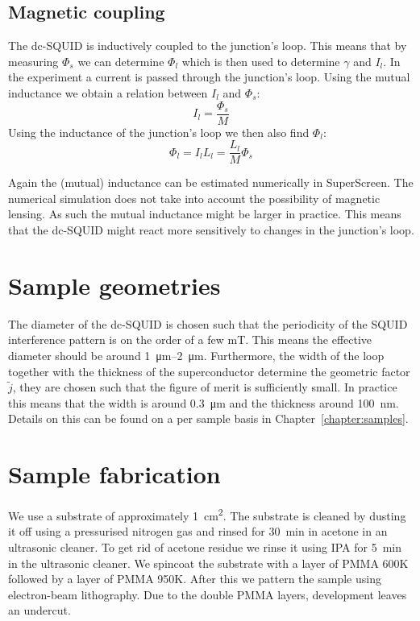 \subsection{Magnetic coupling}
\label{sec:magnetic-coupling}
The dc-SQUID is inductively coupled to the junction's loop. This means that by measuring $\Phi_s$ we can determine $\Phi_l$ which is then used to determine $\gamma$ and $I_l$. In the experiment a current is passed through the junction's loop. Using the mutual inductance we obtain a relation between $I_l$ and $\Phi_s$:
\begin{equation}
	I_l = \frac{\Phi_s}{M}
\end{equation}
Using the inductance of the junction's loop we then also find $\Phi_l$:
\begin{equation}
	\Phi_l = I_lL_l = \frac{L_l}{M}\Phi_s
\end{equation}

Again the (mutual) inductance can be estimated numerically in SuperScreen.\cite{bishop-vanhornSuperScreenOpensourcePackage2022} The numerical simulation does not take into account the possibility of magnetic lensing.\cite{prigozhin3DSimulationSuperconducting2018} As such the mutual inductance might be larger in practice. This means that the dc-SQUID might react more sensitively to changes in the junction's loop.

\section{Sample geometries}
The diameter of the dc-SQUID is chosen such that the periodicity of the SQUID interference pattern is on the order of a few \unit{\milli\tesla}. This means the effective diameter should be around \qtyrange{1}{2}{\micro\meter}. Furthermore, the width of the loop together with the thickness of the superconductor determine the geometric factor $\tilde{j}$, they are chosen such that the figure of merit is sufficiently small. In practice this means that the width is around \qty{0.3}{\micro\meter} and the thickness around \qty{100}{\nano\meter}. Details on this can be found on a per sample basis in Chapter~\ref{chapter:samples}.

\section{Sample fabrication}
\label{sec:method-sample-fabrication}
We use a  substrate of approximately \qty{1}{\square\centi\meter}. The substrate is cleaned by dusting it off using a pressurised nitrogen gas and rinsed for \qty{30}{\minute} in acetone in an ultrasonic cleaner. To get rid of acetone residue we rinse it using IPA for \qty{5}{\minute} in the ultrasonic cleaner. We spincoat the substrate with a layer of PMMA 600K followed by a layer of PMMA 950K. After this we pattern the sample using electron-beam lithography. Due to the double PMMA layers, development leaves an undercut.

